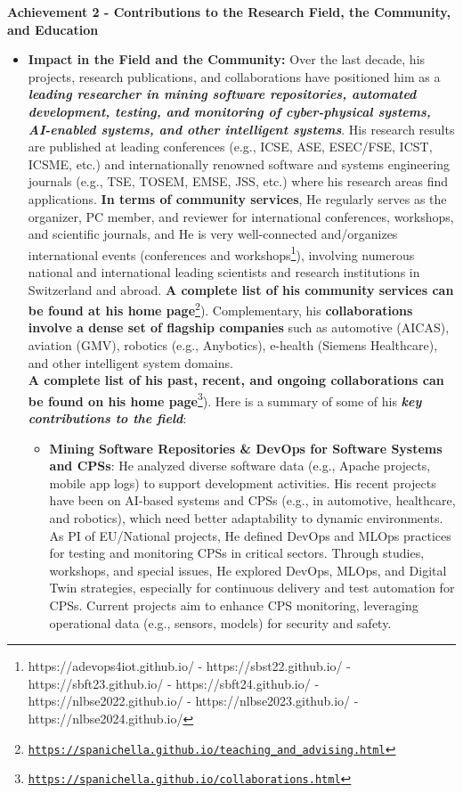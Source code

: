 \documentclass[11pt]{article}
\providecommand*\url[1]{\href{#1}{#1}}
\renewcommand*\url[1]{\href{#1}{\texttt{#1}}}
\begin{document}
\vspace{1mm}
\noindent \textbf{Achievement 2 - Contributions to the Research Field, the Community, and Education}
\vspace{-2.5mm}
\begin{itemize} 
\item \textbf{Impact in the Field and the Community:} 
Over the last decade, his projects, research publications, and collaborations have positioned him as a \textbf{\textit{leading researcher in mining software repositories, automated development, testing, and monitoring of cyber-physical systems, AI-enabled systems, and other intelligent systems}}. 
His research results are published at leading conferences (e.g., ICSE, ASE, ESEC/FSE, ICST, ICSME, etc.) and internationally renowned software and
systems engineering journals (e.g., TSE, TOSEM, EMSE, JSS, etc.) where his research areas find applications. 
\textbf{In terms of community services}, He regularly serves as the organizer, PC member, and reviewer for international conferences, workshops, and scientific journals, and He is very well-connected and/organizes international events
(conferences and workshops\footnote{https://adevops4iot.github.io/
-	https://sbst22.github.io/ - https://sbft23.github.io/ - https://sbft24.github.io/ -	https://nlbse2022.github.io/ - https://nlbse2023.github.io/ - https://nlbse2024.github.io/}), involving numerous national and international leading scientists
and research institutions in Switzerland and abroad. \textbf{A complete list of his community services can be found at his home page}\footnote{\url{https://spanichella.github.io/teaching\_and\_advising.html}}). 
Complementary, his \textbf{collaborations involve a dense set of flagship companies} such as automotive (AICAS), aviation (GMV), robotics (e.g.,
Anybotics), e-health (Siemens Healthcare), and other intelligent system domains.  \\
\textbf{A complete list of his past, recent, and ongoing collaborations can be found on his home page}\footnote{\url{https://spanichella.github.io/collaborations.html}}). 
Here is a summary of some of his \textbf{\textit{key contributions to the field}}:  
\begin{itemize}
\vspace{-2.5mm}
\item 
\textbf{Mining Software Repositories \& DevOps for Software Systems and CPSs}: He analyzed diverse software data (e.g., Apache projects, mobile app logs) to support development activities. His recent projects have been on AI-based systems and CPSs (e.g., in automotive, healthcare, and robotics), which need better adaptability to dynamic environments. As PI of EU/National projects, He defined DevOps and MLOps practices for testing and monitoring CPSs in critical sectors. Through studies, workshops, and special issues, He explored DevOps, MLOps, and Digital Twin strategies, especially for continuous delivery and test automation for CPSs. Current projects aim to enhance CPS monitoring, leveraging operational data (e.g., sensors, models) for security and safety.


\end{itemize}
\end{itemize}
\end{document}
